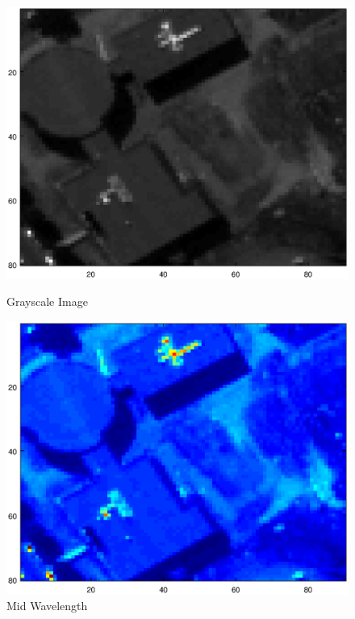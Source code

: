 \documentclass[12pt]{article}
\begin{document}
\begin{figure}
\begin{minipage}{.5\textwidth}
  \includegraphics[width=\linewidth]{./Images/paviaSub/gray.eps}
  \caption{Grayscale Image}
  \label{fig:PaviaSubGray}
\end{minipage}\hfill
\begin{minipage}{.5\textwidth}
  \includegraphics[width=\linewidth]{./Images/paviaSub/band51.eps}
  \caption{Mid Wavelength}
  \label{fig:PaviaSubMid}
\end{minipage}
\end{figure}
\end{document}
